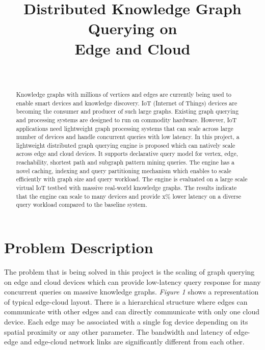 \documentclass[conference]{IEEEtran}
\begin{document}
\title{Distributed Knowledge Graph Querying on \\ Edge and Cloud}


\author{\\
}


\maketitle


\begin{abstract}
Knowledge graphs with millions of vertices and edges are currently being used to enable smart devices and knowledge discovery. IoT (Internet of Things) devices are becoming the consumer and producer of such large graphs. Existing graph querying and processing systems are designed to run on commodity hardware. However, IoT applications need lightweight graph processing systems that can scale across large number of devices and  handle concurrent queries with low latency. In this project, a lightweight distributed graph querying engine is proposed which can natively scale across edge and cloud devices. It supports declarative query model for vertex, edge, reachability, shortest path and subgraph pattern mining queries. The engine has a novel caching, indexing and query partitioning mechanism which enables to scale efficiently with graph size and query workload. The engine is evaluated on a large scale virtual IoT testbed with massive real-world knowledge graphs. The results indicate that the engine can scale to many devices and provide x\% lower latency on a diverse query workload compared to the baseline system.
\end{abstract}

\section{Problem Description}
The problem that is being solved in this project is the scaling of graph querying on edge and cloud devices which can provide low-latency query response for many concurrent queries on massive knowledge graphs. \emph{Figure 1} shows a representation of typical edge-cloud layout. There is a hierarchical structure where edges can communicate with other edges and can directly communicate with only one cloud device. Each edge may be associated with a single fog device depending on its spatial proximity or any other parameter. The bandwidth and latency of edge-edge and edge-cloud network links are significantly different from each other.
\end{document}
